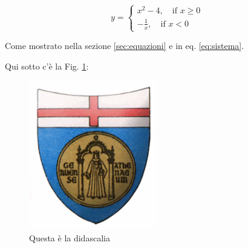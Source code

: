 \begin{equation}
y = \begin{cases}
		x^2-4, \quad \textrm{if } x \geq 0 \\
		-\frac{1}{x}, \quad \textrm{if } x < 0
		\end{cases}
		\label{eq:sistema}
\end{equation}

Come mostrato nella sezione \ref{sec:equazioni} e in eq. \eqref{eq:sistema}.

Qui sotto c'è la Fig. \ref{fig:logo}:
\begin{figure}[hbt!]
\centering
\includegraphics[width=0.5\textwidth]{figure/logounige.jpg}
\caption{Questa è la didascalia}
\label{fig:logo}
\end{figure}






